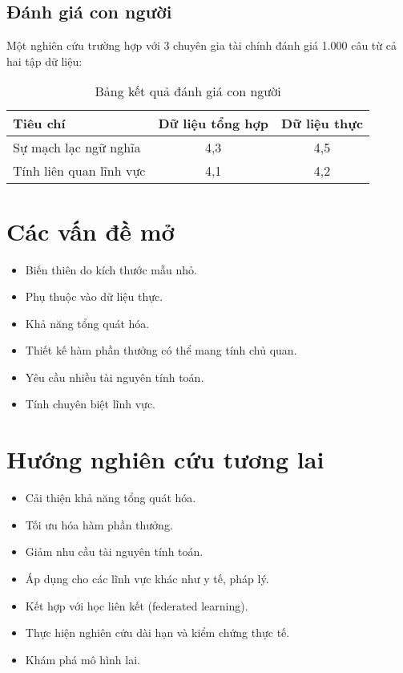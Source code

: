 \documentclass[a4paper,12pt]{article}
\begin{document}
\subsection{Đánh giá con người}
Một nghiên cứu trường hợp với 3 chuyên gia tài chính đánh giá 1.000 câu từ cả hai tập dữ liệu:
\begin{table}[h]
    \centering
    \begin{tabular}{lcc}
        \toprule
        \textbf{Tiêu chí} & \textbf{Dữ liệu tổng hợp} & \textbf{Dữ liệu thực} \\
        \midrule
        Sự mạch lạc ngữ nghĩa & 4,3 & 4,5 \\
        Tính liên quan lĩnh vực & 4,1 & 4,2 \\
        \bottomrule
    \end{tabular}
    \caption{Bảng kết quả đánh giá con người}
\end{table}

\section{Các vấn đề mở}
\begin{itemize}
    \item Biến thiên do kích thước mẫu nhỏ.
    \item Phụ thuộc vào dữ liệu thực.
    \item Khả năng tổng quát hóa.
    \item Thiết kế hàm phần thưởng có thể mang tính chủ quan.
    \item Yêu cầu nhiều tài nguyên tính toán.
    \item Tính chuyên biệt lĩnh vực.
\end{itemize}

\section{Hướng nghiên cứu tương lai}
\begin{itemize}
    \item Cải thiện khả năng tổng quát hóa.
    \item Tối ưu hóa hàm phần thưởng.
    \item Giảm nhu cầu tài nguyên tính toán.
    \item Áp dụng cho các lĩnh vực khác như y tế, pháp lý.
    \item Kết hợp với học liên kết (federated learning).
    \item Thực hiện nghiên cứu dài hạn và kiểm chứng thực tế.
    \item Khám phá mô hình lai.
\end{itemize}
\end{document}
